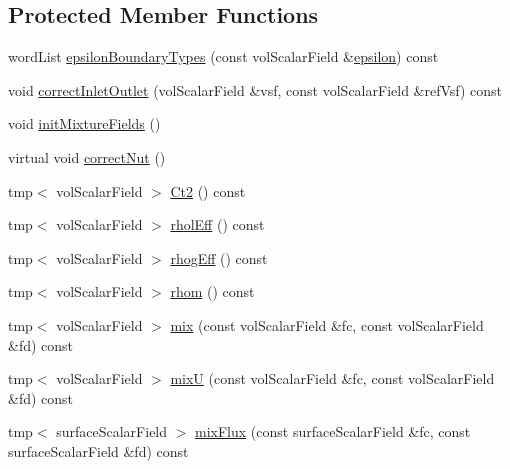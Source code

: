 \subsection*{Protected Member Functions}
\begin{DoxyCompactItemize}
\item 
word\+List \hyperlink{classFoam_1_1RASModels_1_1mixtureKEpsilon_acd126d9f66656609b863fc64abb95ebb}{epsilon\+Boundary\+Types} (const vol\+Scalar\+Field \&\hyperlink{classFoam_1_1RASModels_1_1mixtureKEpsilon_ad79e047917669fbb490d351478651e20}{epsilon}) const
\item 
void \hyperlink{classFoam_1_1RASModels_1_1mixtureKEpsilon_a6c9b72005b8fcf50b18e3a402ca6df13}{correct\+Inlet\+Outlet} (vol\+Scalar\+Field \&vsf, const vol\+Scalar\+Field \&ref\+Vsf) const
\item 
void \hyperlink{classFoam_1_1RASModels_1_1mixtureKEpsilon_a40ddbf65a437e96f6eb32570efbe2406}{init\+Mixture\+Fields} ()
\item 
virtual void \hyperlink{classFoam_1_1RASModels_1_1mixtureKEpsilon_aaffe89433f18f1ee4137486e19219448}{correct\+Nut} ()
\item 
tmp$<$ vol\+Scalar\+Field $>$ \hyperlink{classFoam_1_1RASModels_1_1mixtureKEpsilon_a2025b7aa290d9718fd3ec3836b8638ad}{Ct2} () const
\item 
tmp$<$ vol\+Scalar\+Field $>$ \hyperlink{classFoam_1_1RASModels_1_1mixtureKEpsilon_ad20e49762dcdd6c26212a137b31428a9}{rhol\+Eff} () const
\item 
tmp$<$ vol\+Scalar\+Field $>$ \hyperlink{classFoam_1_1RASModels_1_1mixtureKEpsilon_a27adc4bedfa8846c8b1de026e52dbf46}{rhog\+Eff} () const
\item 
tmp$<$ vol\+Scalar\+Field $>$ \hyperlink{classFoam_1_1RASModels_1_1mixtureKEpsilon_a56d7a7c8700e627733e88944d62ea0da}{rhom} () const
\item 
tmp$<$ vol\+Scalar\+Field $>$ \hyperlink{classFoam_1_1RASModels_1_1mixtureKEpsilon_ad6ae3b3ff7f405c5378f7943f5bf5506}{mix} (const vol\+Scalar\+Field \&fc, const vol\+Scalar\+Field \&fd) const
\item 
tmp$<$ vol\+Scalar\+Field $>$ \hyperlink{classFoam_1_1RASModels_1_1mixtureKEpsilon_a2db5aef5cb2e243e22eceff5560e798a}{mixU} (const vol\+Scalar\+Field \&fc, const vol\+Scalar\+Field \&fd) const
\item 
tmp$<$ surface\+Scalar\+Field $>$ \hyperlink{classFoam_1_1RASModels_1_1mixtureKEpsilon_ac173b78051f80cc1d7826a9db9690c9c}{mix\+Flux} (const surface\+Scalar\+Field \&fc, const surface\+Scalar\+Field \&fd) const

\end{DoxyCompactItemize}
